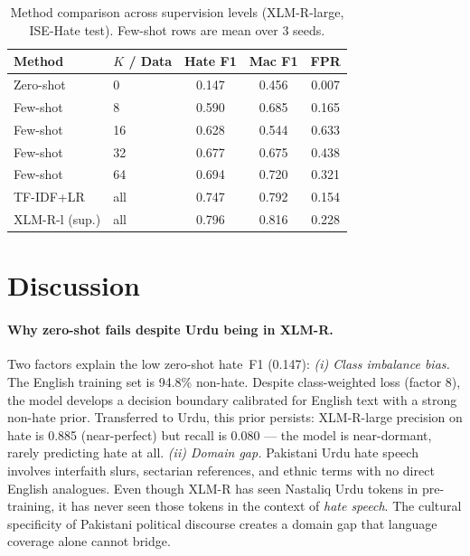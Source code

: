 \documentclass{article}
\begin{document}
\begin{table}[h]
\centering
\caption{Method comparison across supervision levels (XLM-R-large,
         ISE-Hate test). Few-shot rows are mean over 3 seeds.}
\label{tab:ablation}
\vskip 0.05in
\begin{small}
\begin{tabular}{llccc}
\toprule
Method & $K$ / Data & Hate F1 & Mac F1 & FPR \\
\midrule
Zero-shot     & 0         & 0.147 & 0.456 & 0.007 \\
\midrule
Few-shot      & 8         & 0.590 & 0.685 & 0.165 \\
Few-shot      & 16        & 0.628 & 0.544 & 0.633 \\
Few-shot      & 32        & 0.677 & 0.675 & 0.438 \\
Few-shot      & 64        & 0.694 & 0.720 & 0.321 \\
\midrule
TF-IDF+LR     & all       & 0.747 & 0.792 & 0.154 \\
XLM-R-l (sup.)& all       & 0.796 & 0.816 & 0.228 \\
\bottomrule
\end{tabular}
\end{small}
\end{table}

\section{Discussion}
\label{sec:discussion}

\paragraph{Why zero-shot fails despite Urdu being in XLM-R.}
Two factors explain the low zero-shot hate~F1 (0.147):
\textit{(i) Class imbalance bias.}
The English training set is 94.8\% non-hate.
Despite class-weighted loss (factor 8), the model develops a decision
boundary calibrated for English text with a strong non-hate prior.
Transferred to Urdu, this prior persists: XLM-R-large precision on
hate is 0.885 (near-perfect) but recall is 0.080 --- the model is
near-dormant, rarely predicting hate at all.
\textit{(ii) Domain gap.}
Pakistani Urdu hate speech involves interfaith slurs, sectarian references,
and ethnic terms with no direct English analogues.
Even though XLM-R has seen Nastaliq Urdu tokens in pre-training, it has
never seen those tokens in the context of \emph{hate speech}.
The cultural specificity of Pakistani political discourse creates a domain
gap that language coverage alone cannot bridge.
\end{document}
